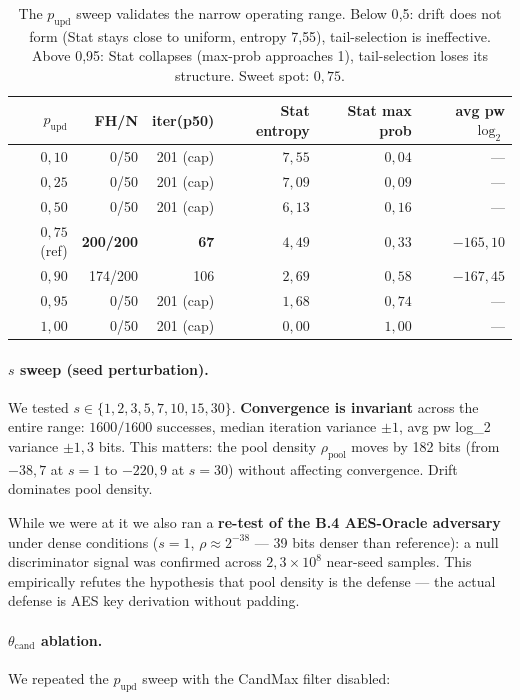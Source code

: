 \documentclass[11pt,a4paper]{article}
\begin{document}
\begin{table}[ht]
\centering
\small
\begin{tabular}{rrrrrr}
\toprule
$p_\text{upd}$ & FH/N & iter(p50) & Stat entropy & Stat max prob & avg pw $\log_2$ \\
\midrule
$0{,}10$ & 0/50 & 201 (cap) & $7{,}55$ & $0{,}04$ & --- \\
$0{,}25$ & 0/50 & 201 (cap) & $7{,}09$ & $0{,}09$ & --- \\
$0{,}50$ & 0/50 & 201 (cap) & $6{,}13$ & $0{,}16$ & --- \\
\textbf{$0{,}75$} (ref) & \textbf{200/200} & \textbf{67} & $4{,}49$ & $0{,}33$ & $-165{,}10$ \\
$0{,}90$ & 174/200 & 106 & $2{,}69$ & $0{,}58$ & $-167{,}45$ \\
$0{,}95$ & 0/50 & 201 (cap) & $1{,}68$ & $0{,}74$ & --- \\
$1{,}00$ & 0/50 & 201 (cap) & $0{,}00$ & $1{,}00$ & --- \\
\bottomrule
\end{tabular}
\caption{The $p_\text{upd}$ sweep validates the narrow operating range. Below 0{,}5: drift does not form (Stat stays close to uniform, entropy 7{,}55), tail-selection is ineffective. Above 0{,}95: Stat collapses (max-prob approaches 1), tail-selection loses its structure. Sweet spot: $0{,}75$.}
\label{tab:pop-pupd-sweep}
\end{table}

\paragraph{$s$ sweep (seed perturbation).}
We tested $s \in \{1, 2, 3, 5, 7, 10, 15, 30\}$. \textbf{Convergence is invariant} across the entire range: $1600/1600$ successes, median iteration variance $\pm 1$, avg pw log\_2 variance $\pm 1{,}3$ bits. This matters: the pool density $\rho_\text{pool}$ moves by 182 bits (from $-38{,}7$ at $s=1$ to $-220{,}9$ at $s=30$) without affecting convergence. Drift dominates pool density.

While we were at it we also ran a \textbf{re-test of the B.4 AES-Oracle adversary} under dense conditions ($s=1$, $\rho \approx 2^{-38}$ --- 39 bits denser than reference): a null discriminator signal was confirmed across $2{,}3 \times 10^8$ near-seed samples. This empirically refutes the hypothesis that pool density is the defense --- the actual defense is AES key derivation without padding.

\paragraph{$\theta_\text{cand}$ ablation.}
We repeated the $p_\text{upd}$ sweep with the CandMax filter disabled:
\end{document}
